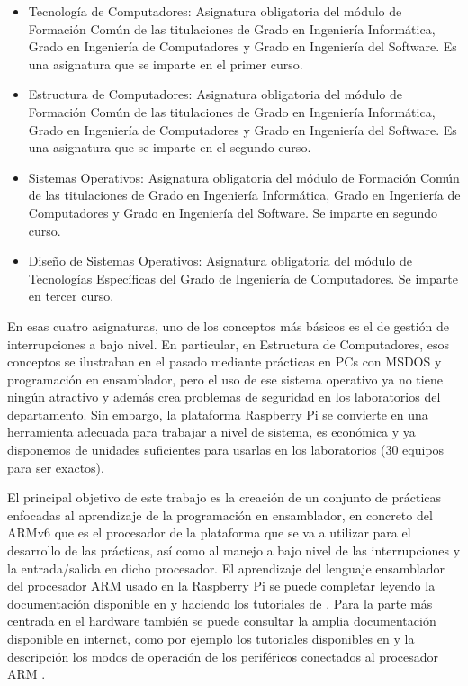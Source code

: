 \begin{itemize}
  \item{Tecnología de Computadores:} Asignatura obligatoria del módulo de Formación
        Común de las titulaciones de Grado en Ingeniería Informática, Grado en
        Ingeniería de Computadores y Grado en Ingeniería del Software. Es una asignatura
        que se imparte en el primer curso.
  \item{Estructura de Computadores:} Asignatura obligatoria del módulo de Formación
        Común de las titulaciones de Grado en Ingeniería Informática, Grado en
        Ingeniería de Computadores y Grado en Ingeniería del Software. Es una asignatura
        que se imparte en el segundo curso.
  \item{Sistemas Operativos:} Asignatura obligatoria del módulo de Formación Común de las
        titulaciones de Grado en Ingeniería Informática, Grado en Ingeniería de
        Computadores y Grado en Ingeniería del Software. Se imparte en segundo curso.
  \item{Diseño de Sistemas Operativos:} Asignatura obligatoria del módulo de Tecnologías
        Específicas del Grado de Ingeniería de Computadores. Se imparte en tercer curso.
\end{itemize}

En esas cuatro asignaturas, uno de los conceptos más básicos es el de gestión de
interrupciones a bajo nivel. En particular, en Estructura de Computadores, esos
conceptos se ilustraban en el pasado mediante prácticas en PCs con MSDOS y programación
en ensamblador, pero el uso de ese sistema operativo ya no tiene ningún atractivo y
además crea problemas de seguridad en los laboratorios del departamento. Sin embargo,
la plataforma Raspberry Pi se convierte en una herramienta adecuada para trabajar a
nivel de sistema, es económica y ya disponemos de unidades suficientes para usarlas
en los laboratorios (30 equipos para ser exactos).
 
El principal objetivo de este trabajo es la creación de un conjunto de prácticas enfocadas
al aprendizaje de la programación en ensamblador, en concreto del ARMv6 que es el
procesador de la plataforma que se va a utilizar para el desarrollo de las prácticas,
así como al manejo a bajo nivel de las interrupciones y la entrada/salida en dicho procesador.
El aprendizaje del lenguaje ensamblador del procesador ARM usado en la
Raspberry Pi se puede completar leyendo la documentación disponible en
\cite{DATH} y haciendo los tutoriales de \cite{TASM}.  Para la parte
más centrada en el hardware también se puede consultar la amplia
documentación disponible en internet, como por ejemplo los tutoriales
disponibles en \cite{BKPI} y la descripción los modos de operación de
los periféricos conectados al procesador ARM \cite{ARMP}.


